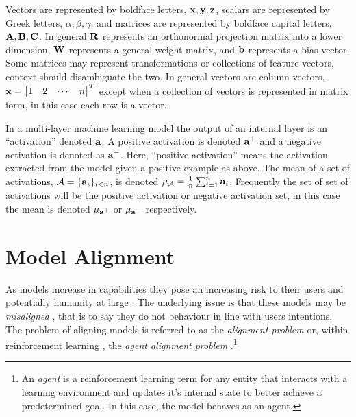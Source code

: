 Vectors are represented by boldface letters, $\mathbf{x}, \mathbf{y}, \mathbf{z}$, scalars are represented by Greek letters, $\alpha, \beta, \gamma$, and matrices are represented by boldface capital letters, $\mathbf{A}, \mathbf{B}, \mathbf{C}$.
In general $\mathbf{R}$ represents an orthonormal projection matrix into a lower dimension, $\mathbf{W}$ represents a general weight matrix, and $\mathbf{b}$ represents a bias vector.
Some matrices may represent transformations or collections of feature vectors, context should disambiguate the two.
In general vectors are column vectors, $\vx = \begin{bmatrix*}
    1 & 2 & \cdots & n
\end{bmatrix*}^T$ except when a collection of vectors is represented in matrix form, in this case each row is a vector.

In a multi-layer machine learning model the output of an internal layer is an ``activation'' denoted $\mathbf{a}$.
A positive activation is denoted $\mathbf{a}^+$ and a negative activation is denoted as $\mathbf{a}^-$. Here, ``positive activation'' means the activation extracted from the model given a positive example as above.
The mean of a set of activations, $\mathcal{A} = \{\mathbf{a}_i\}_{i < n}$, is denoted $\mu_\mathcal{A} = \frac{1}{n}\sum_{i=1}^{n}\mathbf{a}_i$.
Frequently the set of set of activations will be the positive activation or negative activation set, in this case the mean is denoted $\mu_{\mathbf{a}^+}$ or $\mu_{\mathbf{a}^-}$ respectively.

\section{Model Alignment}

As models increase in capabilities \citep{dynabench, hle, gpt-5, grok-4} they pose an increasing risk to their users \citep{c.ai, psychosis} and potentially humanity at large \citep{survellience, deepfakes, disempowerment}.
The underlying issue is that these models may be \emph{misaligned} \citep{agent-alignment}, that is to say they do not behaviour in line with users intentions.
The problem of aligning models is referred to as the \emph{alignment problem} or, within reinforcement learning \cite{rl}, the \emph{agent alignment problem} \citep{agent-alignment}.\footnote{An \emph{agent} is a reinforcement learning term for any entity that interacts with a learning environment and updates it's internal state to better achieve a predetermined goal. In this case, the model behaves as an agent.}

